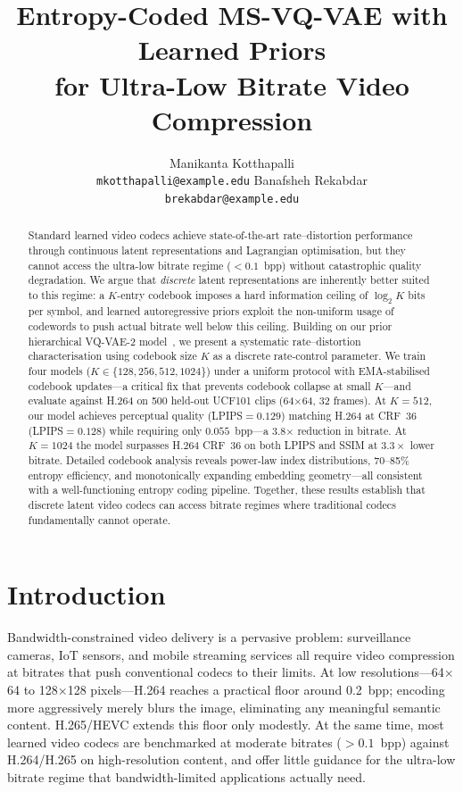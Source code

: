 \documentclass{article}
\title{Entropy-Coded \textsc{MS-VQ-VAE} with Learned Priors\\
       for Ultra-Low Bitrate Video Compression}
\author{%
  Manikanta Kotthapalli \\
  \texttt{mkotthapalli@example.edu}
  \And
  Banafsheh Rekabdar \\
  \texttt{brekabdar@example.edu}
}
\begin{document}
\maketitle

\begin{abstract}
Standard learned video codecs achieve state-of-the-art rate--distortion
performance through continuous latent representations and Lagrangian
optimisation, but they cannot access the ultra-low bitrate regime
($<\!0.1$~bpp) without catastrophic quality degradation.
We argue that \emph{discrete} latent representations are inherently
better suited to this regime: a $K$-entry codebook imposes a hard information
ceiling of $\log_2 K$ bits per symbol, and learned autoregressive priors
exploit the non-uniform usage of codewords to push actual bitrate well below
this ceiling.
Building on our prior hierarchical VQ-VAE-2 model~\cite{kotthapalli2024msvqvae},
we present a systematic rate--distortion characterisation using codebook size
$K$ as a discrete rate-control parameter.
We train four models ($K \in \{128, 256, 512, 1024\}$) under a uniform
protocol with EMA-stabilised codebook updates---a critical fix that prevents
codebook collapse at small $K$---and evaluate against H.264 on 500 held-out
UCF101 clips (64$\times$64, 32 frames).
At $K{=}512$, our model achieves perceptual quality (LPIPS$=0.129$) matching
H.264 at CRF~36 (LPIPS$=0.128$) while requiring only $0.055$~bpp---a
$\mathbf{3.8}\boldsymbol{\times}$ reduction in bitrate.
At $K{=}1024$ the model surpasses H.264 CRF~36 on both LPIPS and SSIM at
$3.3\times$ lower bitrate.
Detailed codebook analysis reveals power-law index distributions, 70--85\%
entropy efficiency, and monotonically expanding embedding geometry---all
consistent with a well-functioning entropy coding pipeline.
Together, these results establish that discrete latent video codecs can access
bitrate regimes where traditional codecs fundamentally cannot operate.
\end{abstract}

\section{Introduction}
\label{sec:intro}

Bandwidth-constrained video delivery is a pervasive problem: surveillance
cameras, IoT sensors, and mobile streaming services all require video
compression at bitrates that push conventional codecs to their limits.
At low resolutions---64$\times$64 to 128$\times$128 pixels---H.264 reaches a
practical floor around 0.2~bpp; encoding more aggressively merely blurs the
image, eliminating any meaningful semantic content.
H.265/HEVC extends this floor only modestly.
At the same time, most learned video codecs are benchmarked at moderate
bitrates ($>0.1$~bpp) against H.264/H.265 on high-resolution content, and
offer little guidance for the ultra-low bitrate regime that bandwidth-limited
applications actually need.
\end{document}

